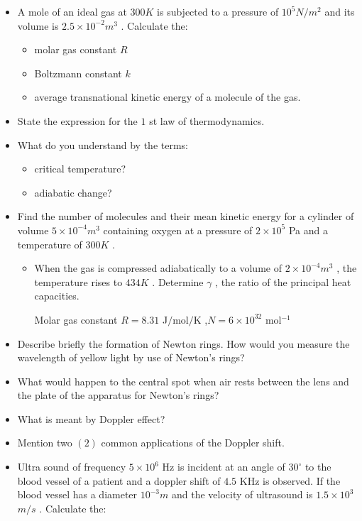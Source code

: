 \documentclass{article}
\begin{document}
\begin{itemize}
\item A mole of an ideal gas at $ 300K$ is subjected to a pressure of $ 10^{5}N/m^{2}$ and its volume is $ 2.5 \times 10^{-2}m^{3}$ .  Calculate the:
 \begin{itemize}
\item molar gas constant $ R$
\item Boltzmann constant $ k$
\item average transnational kinetic energy of a molecule of the gas.
\end{itemize}
\item State the expression for the $ 1$ st law of thermodynamics.
\item What do you understand by the terms:
 \begin{itemize}
\item critical temperature? 
\item adiabatic change?
\end{itemize}
\item Find the number of molecules and their mean kinetic energy for a cylinder of volume $ 5 \times 10^{-4}m^{3}$ containing oxygen at a pressure of $ 2 \times 10^{5}$ Pa and a temperature of $ 300K$ . 
 \begin{itemize}
\item When the gas is compressed adiabatically to a volume of $ 2 \times 10^{-4}m^{3}$ , the temperature rises to $ 434K$ . Determine $ \gamma $ , the ratio of the principal heat capacities.
\item [ Molar gas constant $ R=8.31$ J$/$mol$/$K ,$ N  =6 \times 10^{32}$ mol$^{-1}$ ] 
\end{itemize}
\item Describe briefly the formation of Newton rings. How would you measure the wavelength of yellow light by use of Newton’s rings? 
\item What would happen to the central spot when air rests between the lens and the plate of the apparatus for Newton’s rings? 
\item What is meant by Doppler effect? 
\item Mention two $ (2)$ common applications of the Doppler shift. 
\item Ultra sound of frequency $ 5 \times 10^{6}$ Hz is incident at an angle of $ 30^{\circ}$ to the blood vessel of a patient and a doppler shift of $ 4.5$ KHz is observed. If the blood vessel has a diameter $ 10^{-3}m$ and the velocity of ultrasound is $ 1.5 \times 10^{3}$  $ m/s$ . Calculate the:
 \begin{itemize}

\end{itemize}
\end{itemize}
\end{document}
